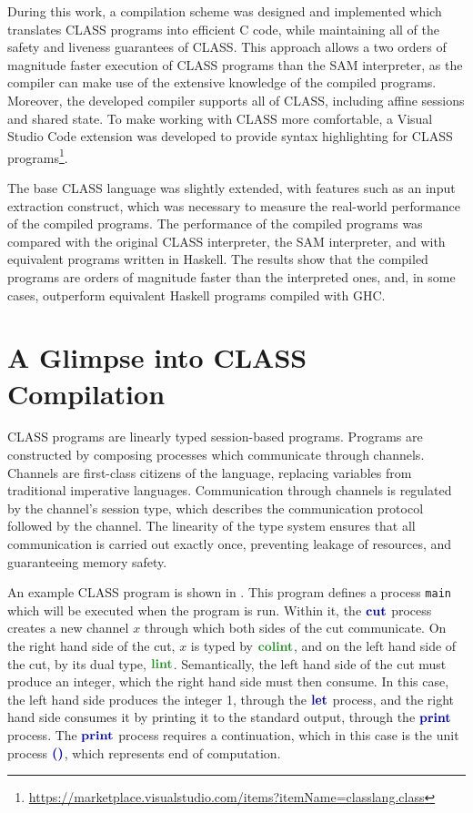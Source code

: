 During this work, a compilation scheme was designed and implemented which translates \ac{CLASS} programs into efficient C code, while maintaining all of the safety and liveness guarantees of \ac{CLASS}. This approach allows a two orders of magnitude faster execution of \ac{CLASS} programs than the \ac{SAM} interpreter, as the compiler can make use of the extensive knowledge of the compiled programs. Moreover, the developed compiler supports all of \ac{CLASS}, including affine sessions and shared state. To make working with \ac{CLASS} more comfortable, a Visual Studio Code extension was developed to provide syntax highlighting for \ac{CLASS} programs\footnote{\url{https://marketplace.visualstudio.com/items?itemName=classlang.class}}.

The base \ac{CLASS} language was slightly extended, with features such as an input extraction construct, which was necessary to measure the real-world performance of the compiled programs. The performance of the compiled programs was compared with the original \ac{CLASS} interpreter, the \ac{SAM} interpreter, and with equivalent programs written in Haskell. The results show that the compiled programs are orders of magnitude faster than the interpreted ones, and, in some cases, outperform equivalent Haskell programs compiled with GHC.


\section{A Glimpse into CLASS Compilation}

\ac{CLASS} programs are linearly typed session-based programs. Programs are constructed by composing processes which communicate through channels. Channels are first-class citizens of the language, replacing variables from traditional imperative languages. Communication through channels is regulated by the channel's session type, which describes the communication protocol followed by the channel. The linearity of the type system ensures that all communication is carried out exactly once, preventing leakage of resources, and guaranteeing memory safety.

An example \ac{CLASS} program is shown in . This program defines a process \texttt{main} which will be executed when the program is run. Within it, the $\cutp$ process creates a new channel $x$ through which both sides of the cut communicate. On the right hand side of the cut, $x$ is typed by $\colintt$, and on the left hand side of the cut, by its dual type, $\lintt$. Semantically, the left hand side of the cut must produce an integer, which the right hand side must then consume. In this case, the left hand side produces the integer 1, through the $\letp$ process, and the right hand side consumes it by printing it to the standard output, through the $\printp$ process. The $\printp$ process requires a continuation, which in this case is the unit process $\emptyp$, which represents end of computation.

